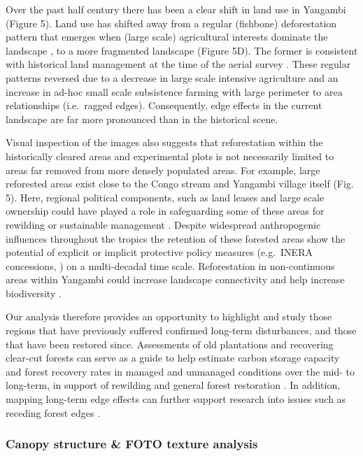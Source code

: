 \documentclass[remote sensing,article,submit,moreauthors,pdftex]{mdpi}
\begin{document}
Over the past half century there has been a clear shift in land use in
Yangambi (Figure 5). Land use has shifted away from a regular (fishbone)
deforestation pattern that emerges when (large scale) agricultural
interests dominate the landscape \citep{arima2015}, to a more fragmented
landscape (Figure 5D). The former is consistent with historical land
management at the time of the aerial survey \citep{bustillo2018}. These
regular patterns reversed due to a decrease in large scale intensive
agriculture and an increase in ad-hoc small scale subsistence farming
with large perimeter to area relationships (i.e.~ragged edges).
Consequently, edge effects in the current landscape are far more
pronounced than in the historical scene.

Visual inspection of the images also suggests that reforestation within
the historically cleared areas and experimental plots is not necessarily
limited to areas far removed from more densely populated areas. For
example, large reforested areas exist close to the Congo stream and
Yangambi village itself (Fig. 5). Here, regional political components,
such as land leases and large scale ownership could have played a role
in safeguarding some of these areas for rewilding or sustainable
management \citep{arima2014, larson2011}. Despite widespread
anthropogenic influences throughout the tropics \citep{lewis2015} the
retention of these forested areas show the potential of explicit or
implicit protective policy measures (e.g.~INERA concessions,
\citet{bustillo2018}) on a multi-decadal time scale. Reforestation in
non-continuous areas within Yangambi could increase landscape
connectivity and help increase biodiversity \citep{vandeperre2018}.

Our analysis therefore provides an opportunity to highlight and study
those regions that have previously suffered confirmed long-term
disturbances, and those that have been restored since. Assessments of
old plantations and recovering clear-cut forests can serve as a guide to
help estimate carbon storage capacity and forest recovery rates in
managed and unmanaged conditions
\citep{gourlet-fleury2013, sader1988, achard2014} over the mid- to
long-term, in support of rewilding and general forest restoration
\citep{arima2014, larson2011, vandeperre2018}. In addition, mapping
long-term edge effects can further support research into issues such as
receding forest edges \citep{gascon2000}.

\hypertarget{canopy-structure-foto-texture-analysis-2}{%
\subsubsection{Canopy structure \& FOTO texture
analysis}\label{canopy-structure-foto-texture-analysis-2}}
\end{document}
